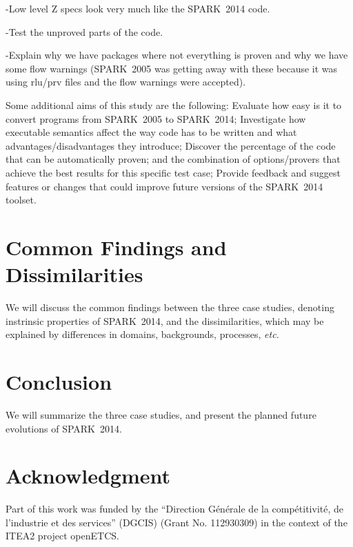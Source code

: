 \documentclass[10pt,a4paper,twocolumn]{article}
\newcommand{\openetcs}{openETCS\xspace}
\newcommand{\oldspark}{SPARK~2005\xspace}
\newcommand{\newspark}{SPARK~2014\xspace}
\newcommand{\etc}{\textit{etc.}\xspace}
\begin{document}
-Low level Z specs look very much like the \newspark code.

-Test the unproved parts of the code.

-Explain why we have packages where not everything is proven and why we
have some flow warnings (\oldspark was getting away with these because
it was using rlu/prv files and the flow warnings were accepted).

Some additional aims of this study are the following: Evaluate how
easy is it to convert programs from \oldspark to \newspark;
Investigate how executable semantics affect the way code has to be
written and what advantages/disadvantages they introduce; Discover the
percentage of the code that can be automatically proven; and the
combination of options/provers that achieve the best results for this
specific test case; Provide feedback and suggest features or changes
that could improve future versions of the \newspark toolset.

\section{Common Findings and Dissimilarities}

We will discuss the common findings between the three case studies,
denoting instrinsic properties of \newspark, and the dissimilarities,
which may be explained by differences in domains, backgrounds,
processes, \etc

\section{Conclusion}

We will summarize the three case studies, and present the planned future
evolutions of \newspark.

\section{Acknowledgment}

Part of this work was funded by the ``Direction Générale de la
compétitivité, de l'industrie et des services'' (DGCIS) (Grant
No. 112930309) in the context of the ITEA2 project \openetcs.



\end{document}
